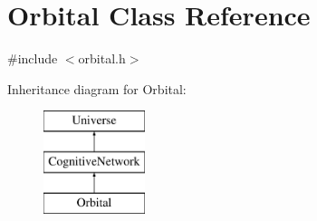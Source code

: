 \hypertarget{classOrbital}{}\section{Orbital Class Reference}
\label{classOrbital}


{\ttfamily \#include $<$orbital.\+h$>$}

Inheritance diagram for Orbital\+:\begin{figure}[H]
\begin{center}
\leavevmode
\includegraphics[height=3.000000cm]{classOrbital}
\end{center}
\end{figure}
